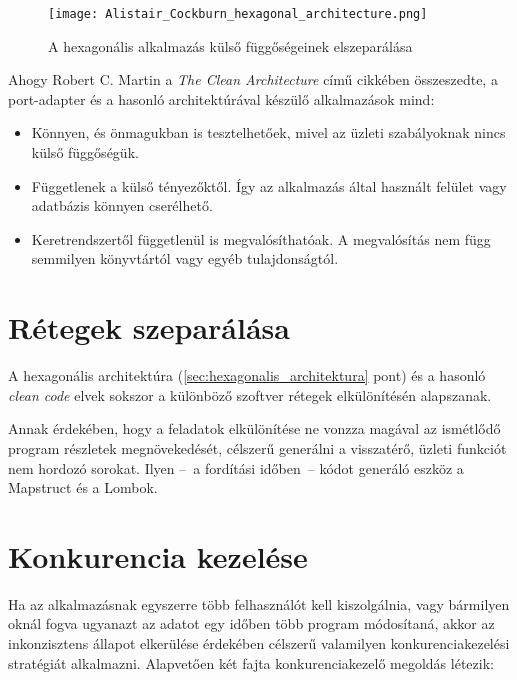 \begin{figure}[hbt] 
	\centering
	\texttt{[image: Alistair\_Cockburn\_hexagonal\_architecture.png]}
	\caption[Hexagonális alkalmazások felépítése]{
		A hexagonális alkalmazás külső függőségeinek elszeparálása}
	\label{fig:Alistair_Cockburn_hexagonal_architecture}
\end{figure}



Ahogy \foreignlanguage{british}{Robert C. Martin} a \foreignlanguage{british}{\emph{The Clean Architecture}} című cikkében \cite{The_Clean_Architecture} összeszedte, a port-adapter és a hasonló architektúrával készülő alkalmazások mind:	
\begin{itemize}
	\item Könnyen, és önmagukban is tesztelhetőek, mivel az üzleti szabályoknak nincs külső függőségük.
	
	\item Függetlenek a külső tényezőktől. Így az alkalmazás által használt felület vagy adatbázis könnyen cserélhető.
	
	\item Keretrendszertől függetlenül is megvalósíthatóak. A megvalósítás nem függ semmilyen könyvtártól vagy egyéb tulajdonságtól.
\end{itemize}
	


\section{Rétegek szeparálása}\label{sec:retegek_szeparalasa}
A hexagonális architektúra (\ref{sec:hexagonalis_architektura} pont) és a hasonló \emph{clean code} \cite{clean_code_chapter_systems} elvek sokszor a különböző szoftver rétegek elkülönítésén alapszanak.


Annak érdekében, hogy a feladatok elkülönítése ne vonzza magával az ismétlődő program részletek megnövekedését, célszerű generálni a visszatérő, üzleti funkciót nem hordozó sorokat. Ilyen --~a fordítási időben~--   kódot generáló eszköz a Mapstruct és a Lombok.


\section{Konkurencia kezelése}\label{sec:konkurencia_kezekese}
Ha az alkalmazásnak egyszerre több felhasználót kell kiszolgálnia, vagy bármilyen oknál fogva ugyanazt az adatot egy időben több program módosítaná, akkor az inkonzisztens állapot elkerülése érdekében célszerű valamilyen konkurenciakezelési stratégiát alkalmazni. Alapvetően két fajta konkurenciakezelő megoldás létezik:

